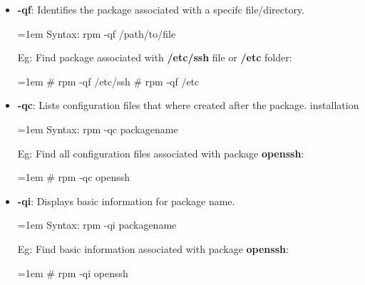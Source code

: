 \begin{flushleft}
\begin{itemize}
		
		\bigskip
		\bigskip
		\newpage
		\item \textbf{-qf}: Identifies the package associated with a specifc file/directory.
		\bigskip
		\begin{tcolorbox}[breakable,notitle,boxrule=-0pt,colback=pink,colframe=pink]
			\color{black}
			\font=1em
			Syntax: rpm -qf /path/to/file
			\font=4pt
		\end{tcolorbox}
		Eg: Find package associated with \textbf{/etc/ssh} file or \textbf{/etc} folder:
		\bigskip
		\begin{tcolorbox}[breakable,notitle,boxrule=-0pt,colback=black,colframe=black]
			\color{white}
			\font=1em
			\color{green}
			\# rpm -qf /etc/ssh
			\newline
			\# rpm -qf /etc
			\font=4pt
		\end{tcolorbox}
		

		\bigskip
		\bigskip
		\item \textbf{-qc}: Lists configuration files that where created after the package. installation
		\bigskip
		\begin{tcolorbox}[breakable,notitle,boxrule=-0pt,colback=pink,colframe=pink]
			\color{black}
			\font=1em
			Syntax: rpm -qc packagename
			\font=4pt
		\end{tcolorbox}
		Eg: Find all configuration files associated with package \textbf{openssh}:
		\bigskip
		\begin{tcolorbox}[breakable,notitle,boxrule=-0pt,colback=black,colframe=black]
			\color{white}
			\font=1em
			\color{green}
			\# rpm -qc openssh
			\font=4pt
		\end{tcolorbox}

		\bigskip
		\bigskip
		\item \textbf{-qi}: Displays basic information for package name.
		\bigskip
		\begin{tcolorbox}[breakable,notitle,boxrule=-0pt,colback=pink,colframe=pink]
			\color{black}
			\font=1em
			Syntax: rpm -qi packagename
			\font=4pt
		\end{tcolorbox}
		Eg: Find basic information associated with package \textbf{openssh}:
		\bigskip
		\begin{tcolorbox}[breakable,notitle,boxrule=-0pt,colback=black,colframe=black]
			\color{white}
			\font=1em
			\color{green}
			\# rpm -qi openssh
			\font=4pt
		\end{tcolorbox}


\end{itemize}
\end{flushleft}
